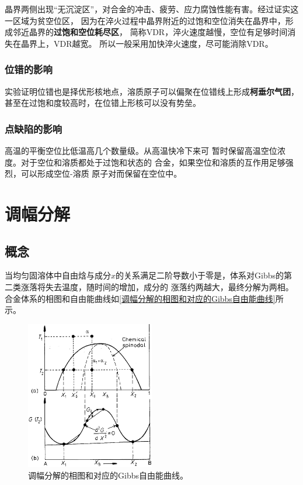                 晶界两侧出现“无沉淀区”，对合金的冲击、疲劳、应力腐蚀性能有害。经过证实这一区域为贫空位区，
                因为在淬火过程中晶界附近的过饱和空位消失在晶界中，形成邻近晶界的\textbf{过饱和空位耗尽区}，
                简称VDR，淬火速度越慢，空位有足够时间消失在晶界上，VDR越宽。
                所以一般采用加快淬火速度，尽可能消除VDR。
            \subsubsection{位错的影响}
                实验证明位错也是择优形核地点，溶质原子可以偏聚在位错线上形成\textbf{柯垂尔气团}，
                甚至在过饱和度较高时，在位错上形核可以没有势垒。
            \subsubsection{点缺陷的影响}
                高温的平衡空位比低温高几个数量级。从高温快冷下来可
                暂时保留高温空位浓度。对于空位和溶质都处于过饱和状态的
                合金，如果空位和溶质的互作用足够强烈，可以形成空位-溶质
                原子对而保留在空位中。


    \section{调幅分解}
        \subsection{概念}
            当均匀固溶体中自由焓与成分$x$的关系满足二阶导数小于零是，体系对Gibbs的第二类涨落将失去温度，随时间的增加，成分的
            涨落约两越大，最终分解为两相。
            合金体系的相图和自由能曲线如\autoref{调幅分解的相图和对应的Gibbs自由能曲线}所示。
            \begin{figure}[ht]
                \centering
                \includegraphics[width=0.5\textwidth]{fig/spinodal_curve.jpg}
                \caption{调幅分解的相图和对应的Gibbs自由能曲线。}
                \label{调幅分解的相图和对应的Gibbs自由能曲线}
            \end{figure}

